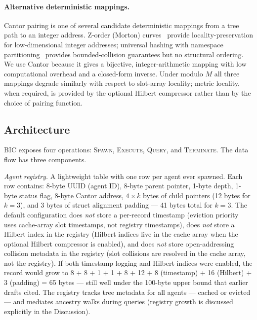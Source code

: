 \documentclass[fleqn,10pt]{article}
\theoremstyle{definition}
\newcommand{\slots}{M}
\begin{document}
\paragraph{Alternative deterministic mappings.}
Cantor pairing is one of several candidate deterministic mappings
from a tree path to an integer address. Z-order (Morton)
curves~\citep{morton1966} provide locality-preservation for
low-dimensional integer addresses; universal hashing with namespace
partitioning~\citep{carter1979universal} provides bounded-collision
guarantees but no structural ordering. We use Cantor because it
gives a bijective, integer-arithmetic mapping with low computational
overhead and a closed-form inverse. Under modulo $\slots$ all three
mappings degrade similarly with respect to slot-array locality;
metric locality, when required, is provided by the optional Hilbert
compressor rather than by the choice of pairing function.

\subsection*{Architecture}

BIC exposes four operations: \textsc{Spawn}, \textsc{Execute},
\textsc{Query}, and \textsc{Terminate}. The data flow has three
components.

\emph{Agent registry.} A lightweight table with one row per agent
ever spawned. Each row contains: 8-byte UUID (agent ID), 8-byte
parent pointer, 1-byte depth, 1-byte status flag, 8-byte Cantor
address, $4 \times k$ bytes of child pointers (12 bytes for
$k{=}3$), and 3 bytes of struct alignment padding --- 41 bytes
total for $k{=}3$. The default configuration does \emph{not} store
a per-record timestamp (eviction priority uses cache-array slot
timestamps, not registry timestamps), does \emph{not} store a
Hilbert index in the registry (Hilbert indices live in the cache
array when the optional Hilbert compressor is enabled), and does
\emph{not} store open-addressing collision metadata in the registry
(slot collisions are resolved in the cache array, not the
registry). If both timestamp logging and Hilbert indices were
enabled, the record would grow to 8 + 8 + 1 + 1 + 8 + 12 + 8
(timestamp) + 16 (Hilbert) + 3 (padding) = 65 bytes --- still well
under the 100-byte upper bound that earlier drafts cited. The
registry tracks tree metadata for all agents --- cached or
evicted --- and mediates ancestry walks during queries (registry
growth is discussed explicitly in the Discussion).
\end{document}
